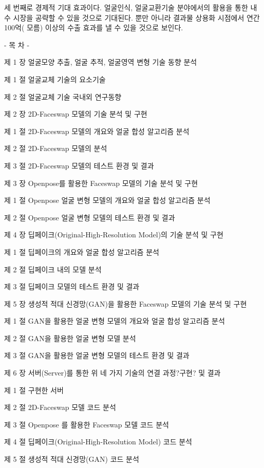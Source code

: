 \documentclass{oblivoir}
\begin{document}
  세 번째로 경제적 기대 효과이다. 얼굴인식, 얼굴교환기술 분야에서의 활용을 통한 내수 시장을 공략할 수 있을 것으로 기대된다. 뿐만 아니라 결과물 상용화 시점에서 연간 100억(
  모름) 이상의 수출 효과를 낼 수 있을 것으로 보인다.
  

-   목     차   -

제  1  장 얼굴모양 추출, 얼굴 추적, 얼굴영역 변형 기술 동향 분석

       제  1  절 얼굴교체 기술의 요소기술

       제  2  절 얼굴교체 기술 국내외 연구동향

제  2  장 2D-Faceswap 모델의 기술 분석 및 구현

       제  1  절 2D-Faceswap 모델의 개요와 얼굴 합성 알고리즘 분석

       제  2  절 2D-Faceswap 모델의 분석

       제  3  절 2D-Faceswap 모델의 테스트 환경 및 결과

제  3  장 Openpose를 활용한 Faceswap 모델의 기술 분석 및 구현

       제  1  절 Openpose 얼굴 변형 모델의 개요와 얼굴 합성 알고리즘 분석

       제  2  절 Openpose 얼굴 변형 모델의 테스트 환경 및 결과

제  4  장 딥페이크(Original-High-Resolution Model)의 기술 분석 및 구현

       제  1  절 딥페이크의 개요와 얼굴 합성 알고리즘 분석

       제  2  절 딥페이크 내의 모델 분석

       제  3  절 딥페이크 모델의 테스트 환경 및 결과

제  5  장 생성적 적대 신경망(GAN)을 활용한 Faceswap 모델의 기술 분석 및 구현

       제  1  절 GAN을 활용한 얼굴 변형 모델의 개요와 얼굴 합성 알고리즘 분석

       제  2  절 GAN을 활용한 얼굴 변형 모델 분석

       제  3  절 GAN을 활용한 얼굴 변형 모델의 테스트 환경 및 결과

제  6  장 서버(Server)를 통한 위 네 가지 기술의  연결 과정?구현? 및 결과  

  제  1  절 구현한 서버 

  제  2  절 2D-Faceswap 모델 코드 분석

  제  3  절 Openpose 를 활용한 Faceswap 모델 코드 분석

  제  4  절 딥페이크(Original-High-Resolution Model) 코드 분석

  제  5  절 생성적 적대 신경망(GAN) 코드 분석
\end{document}
